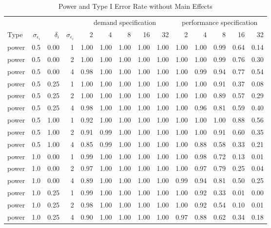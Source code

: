 \begin{table}

\caption{\label{tab:big-basis-table}Power and Type I Error Rate without Main Effects}
\centering
\fontsize{8}{10}\selectfont
\begin{tabular}[t]{lrrrrrrrrrrrrr}
\toprule
\multicolumn{4}{c}{ } & \multicolumn{5}{c}{demand specification} & \multicolumn{5}{c}{performance specification} \\
\cmidrule(l{3pt}r{3pt}){5-9} \cmidrule(l{3pt}r{3pt}){10-14}
Type & $\sigma_{\epsilon_i}$ & $\delta_i$ & $\sigma_{\epsilon_i}$ & 2 & 4 & 8 & 16 & 32 & 2 & 4 & 8 & 16 & 32\\
\midrule
power & 0.5 & 0.00 & 1 & 1.00 & 1.00 & 1.00 & 1.00 & 1.00 & 1.00 & 1.00 & 0.99 & 0.64 & 0.14\\
power & 0.5 & 0.00 & 2 & 1.00 & 1.00 & 1.00 & 1.00 & 1.00 & 1.00 & 1.00 & 0.99 & 0.76 & 0.30\\
power & 0.5 & 0.00 & 4 & 0.98 & 1.00 & 1.00 & 1.00 & 1.00 & 1.00 & 0.99 & 0.94 & 0.77 & 0.54\\
power & 0.5 & 0.25 & 1 & 1.00 & 1.00 & 1.00 & 1.00 & 1.00 & 1.00 & 1.00 & 0.91 & 0.37 & 0.08\\
power & 0.5 & 0.25 & 2 & 1.00 & 1.00 & 1.00 & 1.00 & 1.00 & 1.00 & 1.00 & 0.89 & 0.57 & 0.29\\
power & 0.5 & 0.25 & 4 & 0.98 & 1.00 & 1.00 & 1.00 & 1.00 & 1.00 & 0.96 & 0.81 & 0.59 & 0.40\\
power & 0.5 & 1.00 & 1 & 0.92 & 1.00 & 1.00 & 1.00 & 1.00 & 1.00 & 1.00 & 1.00 & 0.88 & 0.56\\
power & 0.5 & 1.00 & 2 & 0.91 & 0.99 & 1.00 & 1.00 & 1.00 & 1.00 & 1.00 & 0.91 & 0.60 & 0.35\\
power & 0.5 & 1.00 & 4 & 0.85 & 0.99 & 1.00 & 1.00 & 1.00 & 1.00 & 0.88 & 0.58 & 0.33 & 0.21\\
power & 1.0 & 0.00 & 1 & 0.99 & 1.00 & 1.00 & 1.00 & 1.00 & 1.00 & 0.98 & 0.72 & 0.13 & 0.01\\
power & 1.0 & 0.00 & 2 & 0.97 & 1.00 & 1.00 & 1.00 & 1.00 & 1.00 & 0.97 & 0.79 & 0.25 & 0.04\\
power & 1.0 & 0.00 & 4 & 0.89 & 1.00 & 1.00 & 1.00 & 1.00 & 0.99 & 0.94 & 0.81 & 0.50 & 0.25\\
power & 1.0 & 0.25 & 1 & 0.99 & 1.00 & 1.00 & 1.00 & 1.00 & 1.00 & 0.92 & 0.33 & 0.01 & 0.00\\
power & 1.0 & 0.25 & 2 & 0.98 & 1.00 & 1.00 & 1.00 & 1.00 & 1.00 & 0.92 & 0.54 & 0.10 & 0.01\\
power & 1.0 & 0.25 & 4 & 0.90 & 1.00 & 1.00 & 1.00 & 1.00 & 0.97 & 0.88 & 0.62 & 0.34 & 0.18\\

\end{tabular}
\end{table}
